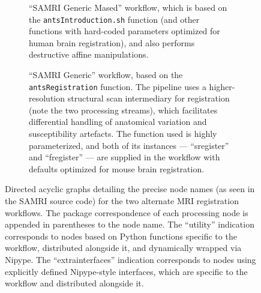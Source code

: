 \begin{figure}[h!]
	\begin{subfigure}{.34\textwidth}
		\centering
		\vspace{-1.9em}
		\caption{
			“SAMRI Generic Mased” workflow, which is based on the \textcolor{mg}{\texttt{antsIntroduction.sh}} function (and other functions with hard-coded parameters optimized for human brain registration), and also performs destructive affine manipulations.
			}
		\label{fig:nwfgl}
	\end{subfigure}\hfill
	\begin{subfigure}{.64\textwidth}
		\centering
		\vspace{1.4em}
		\caption{
			“SAMRI Generic”  workflow, based on the \textcolor{mg}{\texttt{antsRegistration}} function.
			The pipeline uses a higher-resolution structural scan intermediary for registration (note the two processing streams), which facilitates differential handling of anatomical variation and susceptibility artefacts.
			The function used is highly parameterized, and both of its instances --- “s\niceus register” and “f\niceus register” --- are supplied in the workflow with defaults optimized for mouse brain registration.
			}
		\label{fig:nwfgg}
	\end{subfigure}
	\caption{
		Directed acyclic graphs detailing the precise node names (as seen in the SAMRI source code) for the two alternate MRI registration workflows.
		The package correspondence of each processing node is appended in parentheses to the node name.
		The “utility” indication corresponds to nodes based on Python functions specific to the workflow, distributed alongside it, and dynamically wrapped via Nipype.
		The “extra\niceus interfaces” indication corresponds to nodes using explicitly defined Nipype-style interfaces, which are specific to the workflow and distributed alongside it.
		}
	\label{fig:nwfg}
\end{figure}


